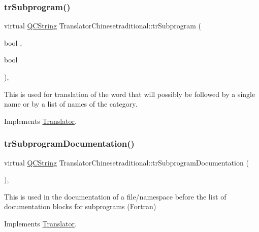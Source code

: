 \subsubsection{\texorpdfstring{trSubprogram()}{trSubprogram()}}
{\footnotesize\ttfamily virtual \mbox{\hyperlink{class_q_c_string}{Q\+C\+String}} Translator\+Chinesetraditional\+::tr\+Subprogram (\begin{DoxyParamCaption}\item[{bool}]{,  }\item[{bool}]{ }\end{DoxyParamCaption})\hspace{0.3cm}{\ttfamily [inline]}, {\ttfamily [virtual]}}

This is used for translation of the word that will possibly be followed by a single name or by a list of names of the category. 

Implements \mbox{\hyperlink{class_translator}{Translator}}.

\mbox{\label{class_translator_chinesetraditional_ab08b94b628f2e02f09e3a02d4b8f85ae}} 
\subsubsection{\texorpdfstring{trSubprogramDocumentation()}{trSubprogramDocumentation()}}
{\footnotesize\ttfamily virtual \mbox{\hyperlink{class_q_c_string}{Q\+C\+String}} Translator\+Chinesetraditional\+::tr\+Subprogram\+Documentation (\begin{DoxyParamCaption}{ }\end{DoxyParamCaption})\hspace{0.3cm}{\ttfamily [inline]}, {\ttfamily [virtual]}}

This is used in the documentation of a file/namespace before the list of documentation blocks for subprograms (Fortran) 

Implements \mbox{\hyperlink{class_translator}{Translator}}.

\mbox{\label{class_translator_chinesetraditional_a2a39bf72af7b4051d6e4c22138eb2bb2}} 
